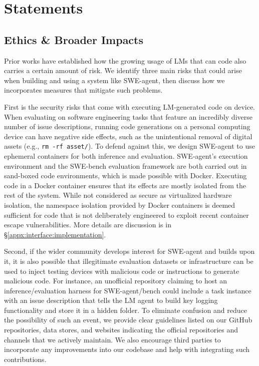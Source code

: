 \section{Statements}

\subsection{Ethics \& Broader Impacts}
\label{appx:statement:impacts}
Prior works have established how the growing usage of LMs that can code also carries a certain amount of risk.
We identify three main risks that could arise when building and using a system like SWE-agent, then discuss how we incorporates measures that mitigate such problems.

First is the security risks that come with executing LM-generated code on device.
When evaluating on software engineering tasks that feature an incredibly diverse number of issue descriptions, running code generations on a personal computing device can have negative side effects, such as the unintentional removal of digital assets (e.g., \texttt{rm -rf asset/}).
To defend against this, we design SWE-agent to use ephemeral containers for both inference and evaluation.
SWE-agent's execution environment and the SWE-bench evaluation framework are both carried out in sand-boxed code environments, which is made possible with Docker.
Executing code in a Docker container ensures that its effects are mostly isolated from the rest of the system.
While not considered as secure as virtualized hardware isolation, the namespace isolation provided by Docker containers is deemed sufficient for code that is not deliberately engineered to exploit recent container escape vulnerabilities.
More details are discussion is in \S\ref{appx:interface:implementation}.

Second, if the wider community develops interest for SWE-agent and builds upon it, it is also possible that illegitimate evaluation datasets or infrastructure can be used to inject testing devices with malicious code or instructions to generate malicious code.
For instance, an unofficial repository claiming to host an inference/evaluation harness for SWE-agent/bench could include a task instance with an issue description that tells the LM agent to build key logging functionality and store it in a hidden folder.
To eliminate confusion and reduce the possibility of such an event, we provide clear guidelines listed on our GitHub repositories, data stores, and websites indicating the official repositories and channels that we actively maintain.
We also encourage third parties to incorporate any improvements into our codebase and help with integrating such contributions.

